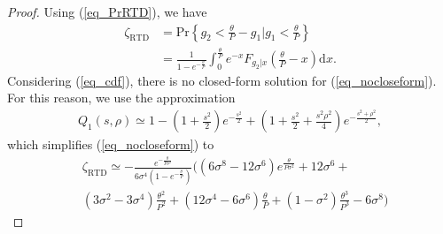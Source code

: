 \begin{proof}
Using (\ref{eq_PrRTD}), we have
\begin{align}
    \zeta_{\text{RTD}} &= \text{Pr}\left\{g_2< \frac{\theta}{P}-g_1  \Big| g_1 < \frac{\theta}{P} \right\}\nonumber\\
    &= \frac{1}{1-e^{-\frac{\theta}{P}}}\int_{0}^{\frac{\theta}{P}} e^{- x} F_{g_2|x}\left(\frac{\theta}{P}-x\right) \text{d}x. \label{eq_nocloseform}
\end{align}
Considering (\ref{eq_cdf}), there is no closed-form solution for (\ref{eq_nocloseform}).  For this reason, we use the  approximation \cite[Eq. 14]{andras2011generalized} 
\begin{align}
    Q_1\left( s, \rho  \right) \simeq  1 - \left( 1 + \frac{s^2}{2} \right)e^{-\frac{s^2}{2}} +
    \left( 1 + \frac{s^2}{2} + \frac{s^2\rho^2}{4} \right)e^{-\frac{s^2+\rho^2}{2}},
\end{align}
which simplifies (\ref{eq_nocloseform}) to 
\begin{align}\label{eq_RTDnopa}
    &\zeta_{\text{RTD}} \simeq 
    -\frac{e^{-\frac{\theta}{P\sigma^2}}}{6\sigma^4\left(1-e^{-\frac{\theta}{P}}\right)}\Bigg(\left(6\sigma^8-12\sigma^6\right)e^{\frac{\theta}{P\sigma^2}}+12\sigma^6+\nonumber\\&\left(3\sigma^2-3\sigma^4\right)\frac{\theta^2}{P^2}+\left(12\sigma^4-6\sigma^6\right)\frac{\theta}{P}+\left(1-\sigma^2\right)\frac{\theta^3}{P^3}-6\sigma^8\Bigg)
\end{align}


\end{proof}
